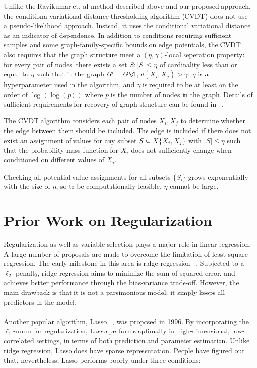 \documentclass[11pt]{article}
\begin{document}
Unlike the Ravikumar et. al method described above and our proposed approach, the conditiona variational distance thresholding algorithm (CVDT) \cite{anandkumar2012high} does not use a pseudo-likelihood approach.  Instead, it uses the conditional variational distance as an indicator of dependence. In addition to conditions requiring sufficient samples and some graph-family-specific bounds on edge potentials, the CVDT also requires that the graph structure meet a $(\eta,\gamma)$-local seperation property: for every pair of nodes, there exists a set $S: |S| \leq \eta$ of cardinality less than or equal to $\eta$ such that in the graph $G' = G\S$, $d(X_i,X_j) > \gamma$. $\eta$ is a hyperparameter used in the algorithm, and $\gamma$ is required to be at least on the order of $\log(\log(p))$ where $p$ is the number of nodes in the graph. Details of sufficient requirements for recovery of graph structure can be found in ~\cite{anandkumar2012high}.

The CVDT algorithm considers each pair of nodes $X_i,X_j$ to determine whether the edge between them should be included.  The edge is included if there does not exist an assignment of values for any subset $S \subseteq X\\\{X_i,X_j\}$ with $|S| \leq \eta$ such that the probability mass function for $X_i$ does not sufficiently change when conditioned on different values of $X_j$.


Checking all potential value assignments for all subsets $\{S_i\}$ grows exponentially with the size of $\eta$, so to be computationally feasible, $\eta$ cannot be large. 




\section{Prior Work on Regularization}

Regularization as well as variable selection plays a major role in linear regression. A large number of proposals are made to overcome the limitation of least square regression. The early milestone in this area is ridge regression ~\cite{AEHoerl1970ridge}. Subjected to a $\ell_2$ penalty, ridge regression aims to minimize the sum of squared error. and achieves better performance through the bias-variance trade-off. However, the main drawback is that it is not a parsimonious model; it simply keeps all predictors in the model. 
\\ \\
Another popular algorithm, Lasso ~\cite{tibshirani1996regression}, was proposed in 1996. By incorporating the $\ell_1$-norm for regularization, Lasso performs optimally in high-dimensional, low-correlated settings, in terms of both prediction and parameter estimation. Unlike ridge regression, Lasso does have sparse representation. People have figured out that, nevertheless, Lasso performs poorly under three conditions:
\end{document}
